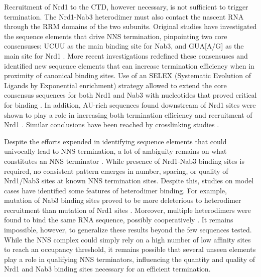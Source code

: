 Recruitment of Nrd1 to the CTD, however necessary, is not sufficient to trigger termination. 
The Nrd1-Nab3 heterodimer must also contact the nascent RNA through the RRM domains of the two subunits.
Original studies have investigated the sequence elements that drive NNS termination, pinpointing two core consensuses: UCUU as the main binding site for Nab3, and GUA[A/G] as the main site for Nrd1 \cite{carroll:2004:identification}. 
More recent investigations redefined these consensuses and identified new sequence elements that can increase termination efficiency when in proximity of canonical binding sites. 
Use of an \invivo{} SELEX (Systematic Evolution of Ligands by Exponential enrichment) strategy allowed to extend the core consensus sequences for both Nrd1 and Nab3 with nucleotides that proved critical for binding \cite{porrua:2012:in}. 
In addition, AU-rich sequences found downstream of Nrd1 sites were shown to play a role in increasing both termination efficiency and recruitment of Nrd1 \cite{porrua:2012:in}. Similar conclusions have been reached by \invivo{} crosslinking studies \cite{wlotzka:2011:nuclear}.

Despite the efforts expended in identifying sequence elements that could univocally lead to NNS termination, a lot of ambiguity remains on what constitutes an NNS terminator \invivo{}. 
While presence of Nrd1-Nab3 binding sites is required, no consistent pattern emerges in number, spacing, or quality of Nrd1/Nab3 sites at known NNS termination sites. 
Despite this, \invitro{} studies on model cases have identified some features of heterodimer binding. 
For example, mutation of Nab3 binding sites proved to be more deleterious to heterodimer recruitment than mutation of Nrd1 sites \cite{carroll:2007:interaction}. 
Moreover, multiple heterodimers were found to bind the same RNA sequence, possibly cooperatively  \cite{carroll:2007:interaction}. 
It remains impossible, however, to generalize these results beyond the few sequences tested. 
While the NNS complex could simply rely on a high number of low affinity sites to reach an occupancy threshold, it remains possible that several unseen elements play a role in qualifying NNS terminators, influencing the quantity and quality of Nrd1 and Nab3 binding sites necessary for an efficient termination.

